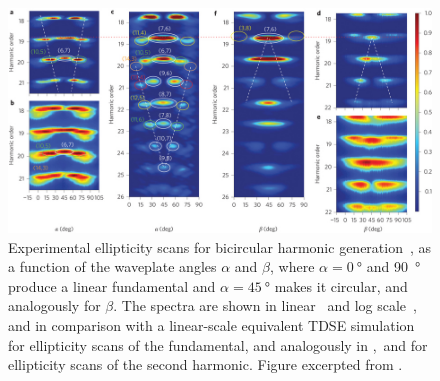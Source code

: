 \begin{figure}[t!]
  \centering
  \subfigure{\label{f8-fleischer-ellipticity-scan-a}}
  \subfigure{\label{f8-fleischer-ellipticity-scan-b}}
  \subfigure{\label{f8-fleischer-ellipticity-scan-c}}
  \subfigure{\label{f8-fleischer-ellipticity-scan-d}}
  \subfigure{\label{f8-fleischer-ellipticity-scan-e}}
  \subfigure{\label{f8-fleischer-ellipticity-scan-f}}
  \includegraphics[width=\textwidth]{8-Spin-HHG/Figures/figure8G.jpg}
  \caption[
  Experimental ellipticity scans on the drivers for bicircular HHG, as observed by A. Fleischer~et~al.
  ]{
  Experimental ellipticity scans for bicircular harmonic generation~\cite{fleischer_spin_2014}, as a function of the waveplate angles $\alpha$ and $\beta$, where $\alpha=\SI{0}{\degree}$ and \SI{90}{\degree} produce a linear fundamental and $\alpha=\SI{45}{\degree}$ makes it circular, and analogously for $\beta$. The spectra are shown in linear~\protect{} and log scale~\protect{}, and in comparison with a linear-scale equivalent TDSE simulation~\protect{} for ellipticity scans of the fundamental, and analogously in \protect{},\,\protect{} and \protect{} for ellipticity scans of the second harmonic.
  Figure excerpted from .
  }
  \label{f8-fleischer-ellipticity-scan}
\end{figure}










